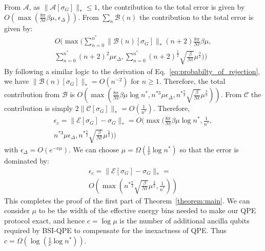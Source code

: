 \documentclass[aps,floatfix,10pt,amssymb,amsfont,amsmath,superscriptaddress,float,nofootinbib,longbibliography,nobalancelastpage,twocolumn]{revtex4-2}
\begin{document}
From $\mathcal{A}$, as $\|\mathcal{A}[\sigma_G]\|_* \leq 1$, the contribution to the total error is given by $O(\max(\frac{8\pi}{Nt}\beta\mu,\epsilon_{\Delta}))$. From $\sum_n\mathcal{B}(n)$ the contribution to the total error is given by:
\begin{multline}
    O\!\bigg(\max\!\bigg(\sum_{n=0}^{n^*}\|\mathcal B(n)[\sigma_G]\|_* (n+2)\frac{8\pi}{Nt}\beta \mu,\\
    \sum_{n=0}^{n^*}(n+2)^2\mu\epsilon_{\Delta}, \sum_{n=0}^{n^*}(n+2)^{\frac{5}{2}}\sqrt{\frac{\beta }{Nt}}\mu^{\frac{3}{2}}\bigg)\bigg)
\end{multline}
By following a similar logic to the derivation of Eq.~\eqref{eq:probabilty_of_rejection}, we have $\|\mathcal B(n)[\sigma_G]\|_* = O(n^{-2})$ for $n\geq1$. Therefore, the total contribution from $\mathcal{B}$ is $O(\!\max(\frac{8\pi}{Nt}\beta \mu \log n^*,n^{*3}\mu\epsilon_{\Delta},n^{*\frac{7}{2}}\sqrt{\frac{\beta }{Nt}}\mu^{\frac{3}{2}}))$. From $\mathcal{C}$ the contribution is simply $2\|\mathcal{C}[\sigma_G]\|_* = O(\frac{1}{n^*})$. Therefore,
 \begin{multline}
   \epsilon_c = \|\mathcal{E}[\sigma_G] - \sigma_G\|_* = O\bigg(\max\bigg( \frac{8\pi}{Nt}\beta\mu \log n^* ,\frac{1}{n^*},\\ n^{*3}\mu\epsilon_{\Delta},n^{*\frac{7}{2}}\sqrt{\frac{\beta }{Nt}}\mu^{\frac{3}{2}}\bigg)\bigg)
   \label{eq:combinedtotalerror}
\end{multline}
with $\epsilon_{\Delta}=O(e^{-\nu\mu})$. We can choose $\mu = \Omega(\frac{1}{\nu}\log n^*)$ so that the error is dominated by:
 \begin{multline}
   \epsilon_c = \|\mathcal{E}[\sigma_G] - \sigma_G\|_* =\\ O\left(\max\left( n^{*\frac{7}{2}}\sqrt{\frac{\beta }{Nt}}\mu^{\frac{3}{2}} ,\frac{1}{n^*}\right)\right)
    \label{eq:error_bound}
\end{multline}
This completes the proof of the first part of Theorem~\ref{theorem:main}. We can consider $\mu$ to be the width of the effective energy bins needed to make our QPE protocol exact, and hence $c=\log\mu$ is the number of additional ancilla qubits required by BSI-QPE to compensate for the inexactness of QPE. Thus $c=\Omega(\log(\frac{1}{\nu}\log n^*))$.
\end{document}
